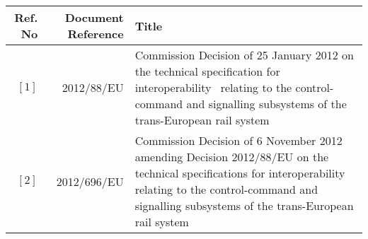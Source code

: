 \begin{tabular}{rr|p{4.7cm}}
\toprule
Ref. No & Document Reference & Title \\
\midrule
$[1]$   & 
2012/88/EU & 
Commission Decision of 25 January 2012 on the technical specification for interoperability \
relating to the control-command and signalling subsystems of the trans-European rail system \\
$[2]$ &
2012/696/EU &
Commission Decision
of 6 November 2012
amending Decision 2012/88/EU on the technical specifications for interoperability relating to the control-command and signalling subsystems of the trans-European rail system\\
\bottomrule
\end{tabular}%
